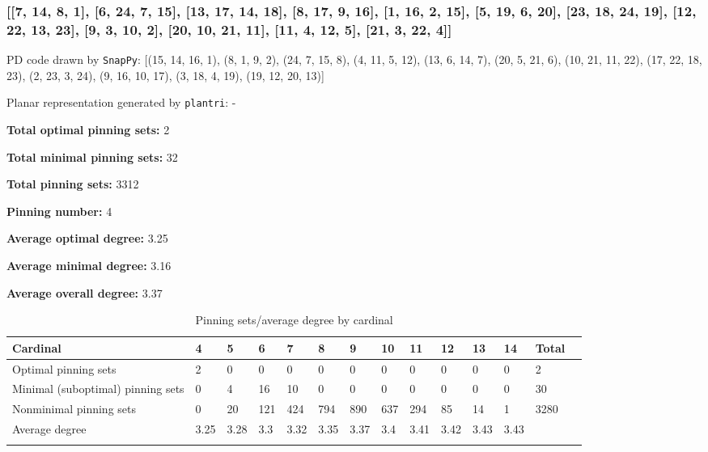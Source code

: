 \documentclass{article}%
\begin{document}
\subsubsection{[[7, 14, 8, 1], [6, 24, 7, 15], [13, 17, 14, 18], [8, 17, 9, 16], [1, 16, 2, 15], [5, 19, 6, 20], [23, 18, 24, 19], [12, 22, 13, 23], [9, 3, 10, 2], [20, 10, 21, 11], [11, 4, 12, 5], [21, 3, 22, 4]]}

{\small\noindent PD code drawn by \texttt{SnapPy}: [(15, 14, 16, 1), (8, 1, 9, 2), (24, 7, 15, 8), (4, 11, 5, 12), (13, 6, 14, 7), (20, 5, 21, 6), (10, 21, 11, 22), (17, 22, 18, 23), (2, 23, 3, 24), (9, 16, 10, 17), (3, 18, 4, 19), (19, 12, 20, 13)]}

{\small\noindent Planar representation generated by \texttt{plantri}: -}

\begin{multicols}{2}
{\normalsize \noindent\textbf{Total optimal pinning sets:} 2

\noindent\textbf{Total minimal pinning sets:} 32

\noindent\textbf{Total pinning sets:} 3312

\noindent\textbf{Pinning number:} 4

}
\columnbreak

{\normalsize \noindent\textbf{Average optimal degree:} 3.25

\noindent\textbf{Average minimal degree:} 3.16

\noindent\textbf{Average overall degree:} 3.37

}
\end{multicols}

\begin{table}[ht]
	\caption{Pinning sets/average degree by cardinal}
	\centering
	\renewcommand{\arraystretch}{1.5}
	\begin{tabularx}{\textwidth}{lXXXXXXXXXXXXX}
		\toprule
			Cardinal & 4 & 5 & 6 & 7 & 8 & 9 & 10 & 11 & 12 & 13 & 14 & Total\\
			\hline
			Optimal pinning sets & 2 & 0 & 0 & 0 & 0 & 0 & 0 & 0 & 0 & 0 & 0 & 2 \\
			Minimal (suboptimal) pinning sets & 0 & 4 & 16 & 10 & 0 & 0 & 0 & 0 & 0 & 0 & 0 & 30 \\
			Nonminimal pinning sets & 0 & 20 & 121 & 424 & 794 & 890 & 637 & 294 & 85 & 14 & 1 & 3280 \\
			Average degree & 3.25 & 3.28 & 3.3 & 3.32 & 3.35 & 3.37 & 3.4 & 3.41 & 3.42 & 3.43 & 3.43 &  \\
		\bottomrule \\ 
	\end{tabularx}
\end{table}
\end{document}
